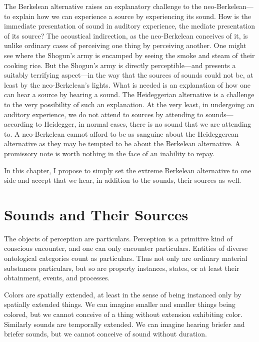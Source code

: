 The Berkelean alternative raises an explanatory challenge to the neo-Berkelean---\-to explain how we can experience a source by experiencing its sound. How is the immediate presentation of sound in auditory experience, the mediate presentation of its source? The acoustical indirection, as the neo-Berkelean conceives of it, is unlike ordinary cases of perceiving one thing by perceiving another. One might see where the Shogun's army is encamped by seeing the smoke and steam of their cooking rice. But the Shogun's army is directly perceptible---and presents a suitably terrifying aspect---in the way that the sources of sounds could not be, at least by the neo-Berkelean's lights. What is needed is an explanation of how one can hear a source by hearing a sound. The Heideggerian alternative is a challenge to the very possibility of such an explanation. At the very least, in undergoing an auditory experience, we do not attend to sources by attending to sounds---according to Heidegger, in normal cases, there is no sound that we are attending to. A neo-Berkelean cannot afford to be as sanguine about the Heideggerean alternative as they may be tempted to be about the Berkelean alternative. A promissory note is worth nothing in the face of an inability to repay.

In this chapter, I propose to simply set the extreme Berkelean alternative to one side and accept that we hear, in addition to the sounds, their sources as well. 


\section{Sounds and Their Sources} %
\label{sec:sounds_and_their_sources}

The objects of perception are particulars. Perception is a primitive kind of conscious encounter, and one can only encounter particulars. Entities of diverse ontological categories count as particulars. Thus not only are ordinary material substances particulars, but so are property instances, states, or at least their obtainment, events, and processes.

Colors are spatially extended, at least in the sense of being instanced only by spatially extended things. We can imagine smaller and smaller things being colored, but we cannot conceive of a thing without extension exhibiting color. Similarly sounds are temporally extended. We can imagine hearing briefer and briefer sounds, but we cannot conceive of sound without duration. 


